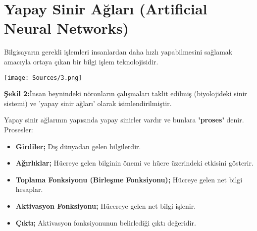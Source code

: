 \documentclass{IEEEtran}
\begin{document}
    \section{Yapay Sinir Ağları (Artificial Neural Networks) }
        \label{sec:yapaysinir}
            Bilgisayarın gerekli işlemleri insanlardan daha hızlı yapabilmesini sağlamak amacıyla ortaya çıkan bir bilgi işlem teknolojisidir.
                \begin{center}
                    \vspace{5pt} \hspace{-15pt}   
                    \texttt{[image: Sources/3.png]} 
                \end{center} \newline
        \textbf{Şekil 2:}İnsan beynindeki nöronların çalışmaları taklit edilmiş (biyolojideki sinir sistemi) ve 'yapay sinir ağları' olarak isimlendirilmiştir.\newline
        
        Yapay sinir ağlarının yapısında yapay sinirler vardır ve bunlara \textbf{'proses'} denir. Prosesler:
        \begin{itemize}
            \item \textbf{Girdiler;} Dış dünyadan gelen bilgilerdir.
            \item \textbf{Ağırlıklar;} Hücreye gelen bilginin önemi ve hücre üzerindeki etkisini gösterir.
            \item \textbf{Toplama Fonksiyonu (Birleşme Fonksiyonu);} Hücreye gelen net bilgi hesaplar.
            \item \textbf{Aktivasyon Fonksiyonu;} Hücereye gelen net bilgi işlenir.
            \item \textbf{Çıktı;} Aktivasyon fonksiyonunun belirlediği çıktı değeridir.
        \end{itemize}\vspace{5pt}
                
\end{document}
